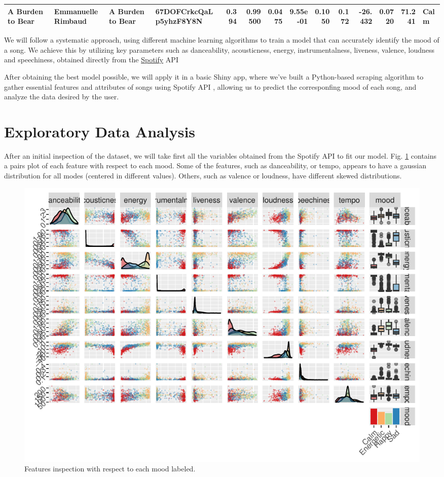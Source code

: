 \documentclass[11pt,]{article}
\begin{document}
\begin{table}[!h]
{\begin{tabular}[t]{llllrrrrrrrrrl}
\addlinespace
A Burden to Bear & Emmanuelle Rimbaud & A Burden to Bear & 67DOFCrkcQaLp5yhzF8Y8N & 0.394 & 0.99500 & 0.0475 & 9.55e-01 & 0.1050 & 0.172 & -26.432 & 0.0720 & 71.241 & Calm\\
\bottomrule
\end{tabular}}
\end{table}

We will follow a systematic approach, using different machine learning
algorithms to train a model that can accurately identify the mood of a
song. We achieve this by utilizing key parameters such as danceability,
acousticness, energy, instrumentalness, liveness, valence, loudness and
speechiness, obtained directly from the
\href{https://open.spotify.com/intl-es}{Spotify} API
\citep{spotifydeveloper}

After obtaining the best model possible, we will apply it in a basic
Shiny app, where we've built a Python-based scraping algorithm to gather
essential features and attributes of songs using Spotify API
\citep{spotifydeveloper}, allowing us to predict the corresponfing mood
of each song, and analyze the data desired by the user.

\hypertarget{exploratory-data-analysis}{%
\section{Exploratory Data Analysis}\label{exploratory-data-analysis}}

After an initial inspection of the dataset, we will take first all the
variables obtained from the Spotify API to fit our model. Fig.
\ref{fig:features} contains a pairs plot of each feature with respect to
each mood. Some of the features, such as danceability, or tempo, appears
to have a gaussian distribution for all modes (centered in different
values). Others, such as valence or loudness, have different skewed
distributions.

\begin{figure}[H]
\includegraphics{figs/features} \caption{Features inspection with respect to each mood labeled.}\label{fig:features}
\end{figure}
\end{document}
